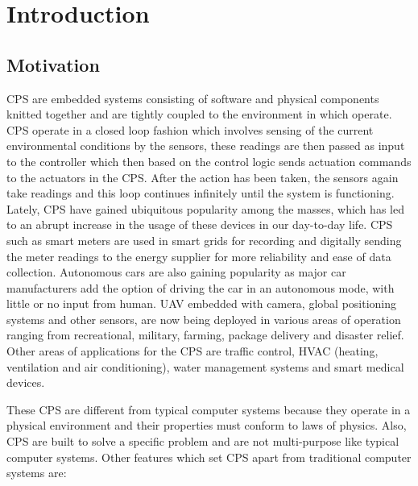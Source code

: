 
\chapter{Introduction}
\label{ch:Introduction}

\section{Motivation}
\label{sec:Motivation}

\ac{CPS} are embedded systems consisting of software and physical components knitted together and are tightly coupled to the environment in which operate. \ac{CPS} operate in a closed loop fashion which involves sensing of the current environmental conditions by the sensors, these readings are then passed as input to the controller which then based on the control logic sends actuation commands to the actuators in the \ac{CPS}. After the action has been taken, the sensors again take readings and this loop continues infinitely until the system is functioning. Lately, \ac{CPS} have gained ubiquitous popularity among the masses, which has led to an abrupt increase in the usage of these devices in our day-to-day life. \ac{CPS} such as smart meters are used in smart grids\cite{karnouskos2011cyber, ericsson2010cyber} for recording and digitally sending the meter readings to the energy supplier for more reliability and ease of data collection. Autonomous cars\cite{checkoway2011comprehensive, yang2014vehicle} are also gaining popularity as major car manufacturers add the option of driving the car in an autonomous mode, with little or no input from human. \ac{UAV}\cite{javaid2012cyber, mohammed2014uavs} embedded with camera, global positioning systems and other sensors, are now being deployed in various areas of operation ranging from recreational, military, farming, package delivery and disaster relief. Other areas of applications for the \ac{CPS} are traffic control, HVAC (heating, ventilation and air conditioning), water management systems and smart medical devices.

These \ac{CPS} are different from typical computer systems because they operate in a physical environment and their properties must conform to laws of physics. Also, \ac{CPS} are built to solve a specific problem and are not multi-purpose like typical computer systems. Other features which set \ac{CPS} apart from traditional computer systems are:

